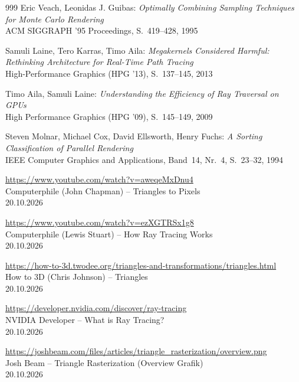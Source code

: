 \begin{thebibliography}{999}
	Eric Veach, Leonidas J. Guibas:
	  \emph{Optimally Combining Sampling Techniques for Monte Carlo Rendering} \\
	  ACM SIGGRAPH '95 Proceedings, S.~419--428, 1995

	Samuli Laine, Tero Karras, Timo Aila:
	  \emph{Megakernels Considered Harmful: Rethinking Architecture for Real-Time Path Tracing} \\
	  High-Performance Graphics (HPG '13), S.~137--145, 2013

	Timo Aila, Samuli Laine:
	  \emph{Understanding the Efficiency of Ray Traversal on GPUs} \\
	  High Performance Graphics (HPG '09), S.~145--149, 2009

	Steven Molnar, Michael Cox, David Ellsworth, Henry Fuchs:
	  \emph{A Sorting Classification of Parallel Rendering} \\
	  IEEE Computer Graphics and Applications, Band~14, Nr.~4, S.~23--32, 1994

	\href{https://www.youtube.com/watch?v=aweqeMxDnu4}{https://www.youtube.com/watch?v=aweqeMxDnu4}\\
	Computerphile (John Chapman) -- Triangles to Pixels\\
	20.10.2026

	\href{https://www.youtube.com/watch?v=ezXGTRSx1g8}{https://www.youtube.com/watch?v=ezXGTRSx1g8}\\
	Computerphile (Lewis Stuart) -- How Ray Tracing Works\\
	20.10.2026

	\href{https://how-to-3d.twodee.org/triangles-and-transformations/triangles.html}{https://how-to-3d.twodee.org/triangles-and-transformations/triangles.html}\\
	How to 3D (Chris Johnson) -- Triangles\\
	20.10.2026

	\href{https://developer.nvidia.com/discover/ray-tracing}{https://developer.nvidia.com/discover/ray-tracing}\\
	NVIDIA Developer -- What is Ray Tracing?\\
	20.10.2026

	\href{https://joshbeam.com/files/articles/triangle\_rasterization/overview.png}{https://joshbeam.com/files/articles/triangle\_rasterization/overview.png}\\
	Josh Beam -- Triangle Rasterization (Overview Grafik)\\
	20.10.2026

\end{thebibliography}
